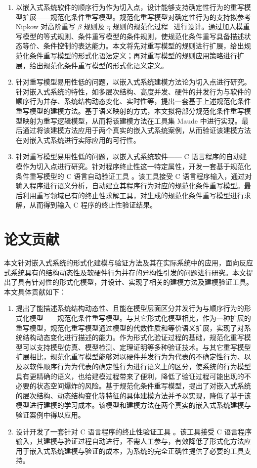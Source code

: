 \begin{enumerate}
\item
以嵌入式系统软件的顺序行为作为切入点，设计能够支持确定性行为的重写模型扩展——规范化条件重写模型。规范化重写模型对确定性行为的支持拟参考 Nipkow 对高阶重写 $\beta$ 规则及 $\eta$ 规则的规范化过程~\cite{DBLP:conf/lics/Nipkow91} 进行设计。通过加入模重写模型的等式规则、条件重写模型的条件规则，使规范化条件重写具备描述状态等价、条件控制的表达能力。本文将先对重写模型的规则进行扩展，给出规范化条件重写模型的形式化语法定义；再对重写模型的规则应用策略进行扩展，给出规范化条件重写模型的形式化语义定义。
\item
针对重写模型易用性低的问题，以嵌入式系统建模方法论为切入点进行研究。针对嵌入式系统的特性，如多层次结构、高度并发、硬件的并发行为与软件的顺序行为并存、系统结构动态变化、实时性等，提出一套基于上述规范化条件重写模型的建模方法。基于语义映射的方式，本文拟将部分规范化条件重写模型映射为重写逻辑模型，从而将该建模方法在工具集 Maude 中进行实现。最后通过将该建模方法应用于两个真实的嵌入式系统案例，从而验证该建模方法在对嵌入式系统进行实际应用的可行性。 
\item
针对重写模型易用性低的问题，以嵌入式系统软件—— C 语言程序的自动建模作为切入点进行研究。针对程序终止性这一特定属性，开发一套基于规范化条件重写模型的 C 语言自动验证工具 \CTerm。该工具接受 C 语言程序输入，通过对输入程序进行语义分析，自动建立其程序行为对应的规范化条件重写模型。最后利用重写领域已有的终止性求解工具，对生成的规范化条件重写模型进行求解，从而得到输入 C 程序的终止性验证结果。
\end{enumerate}

\section{论文贡献}

本文针对嵌入式系统的形式化建模与验证方法及其在实际系统中的应用，面向反应式系统具有的结构动态性及软硬件行为并存的异构性引发的问题进行研究。本文提出了具有针对性的形式化模型，并设计、实现了相关的建模方法及建模验证工具。本文具体贡献如下：

\begin{enumerate}
\item 提出了能描述系统结构动态性、且能在模型层面区分并发行为与顺序行为的形式化模型——规范化条件重写模型。与其它形式化模型相比，作为一种扩展的重写模型，规范化重写模型通过模型的代数性质和等价语义扩展，实现了对系统结构动态变化进行描述的能力。作为形式化验证过程的基础，规范化重写模型可以支持模型仿真、模型检测、定理证明等多种验证技术。与其它重写模型扩展相比，规范化重写模型能够对以硬件并发行为为代表的不确定性行为、以及以软件顺序行为为代表的确定性行为进行语义上的区分，使系统的行为模型具有更精确的语义，也给建模过程带来了便利，降低了验证过程可能出现的不必要的状态空间爆炸的风险。基于规范化条件重写模型，提出了对嵌入式系统的层次结构、动态结构变化等特征的具体建模方法并予以实现，降低了基于该模型进行建模的学习成本。该模型和建模方法在两个真实的嵌入式系统建模与验证案例中得以应用。
\item 设计开发了一套针对 C 语言程序的终止性验证工具 \CTerm。该工具接受 C 语言程序输入，其建模与验证过程自动进行，不需人工参与，有效降低了形式化方法应用于嵌入式系统建模与验证的成本，为系统的完全正确性提供了必要的工具支持。
\end{enumerate}

